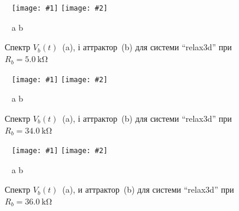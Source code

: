 \documentclass[14pt,handout,utf8]{beamer}
\newcommand{\Xhead}[1]{
 \begin{center}%
      \textbf{#1}%
 \end{center}%
}
\newcommand{\ABlbl}{%
  \vspace{-2.7ex}
  \begin{center}
    ~ \hfill a \hfill\hfill b \hfill ~
  \end{center}
  \vspace{-2.0ex}
}
\newcommand{\PicDoubleS}[2]{%
 \begin{center}
    ~ \hfill
    \texttt{[image: \#1]}
    \hfill
    \texttt{[image: \#2]}
    \hfill ~
  \end{center}
  \ABlbl
}
\begin{document}
\begin{frame}
  \frametitle{~}

  \Xhead{}

  \begin{figure}
    \PicDoubleS{../p7/p/relax3d_f_02.png}{../p7/p/relax3d_v1v2v3_02.png}
    \caption{Спектр $V_b(t)$~(a), і аттрактор~(b) для системи ``relax3d'' при $R_b = \SI{5.0}{\kilo \ohm} $}
    \label{atu:f:relax3d_f_02}
  \end{figure}

  \begin{figure}
    \PicDoubleS{../p7/p/relax3d_f_08.png}{../p7/p/relax3d_v1v2v3_08.png}
    \caption{Спектр $V_b(t)$~(a), і аттрактор~(b) для системи ``relax3d'' при $ R_b = \SI{34.0}{\kilo\ohm} $}
    \label{atu:f:relax3d_f_08}
  \end{figure}

  \begin{figure}
    \PicDoubleS{../p7/p/relax3d_f_09.png}{../p7/p/relax3d_v1v2v3_09.png}
    \caption{Спектр $V_b(t)$~(a), и аттрактор~(b) для системи ``relax3d'' при $R_b=\SI{36.0}{\kilo\ohm}$ }
    \label{atu:f:relax3d_f_09}
  \end{figure}

\end{frame}


\end{document}
